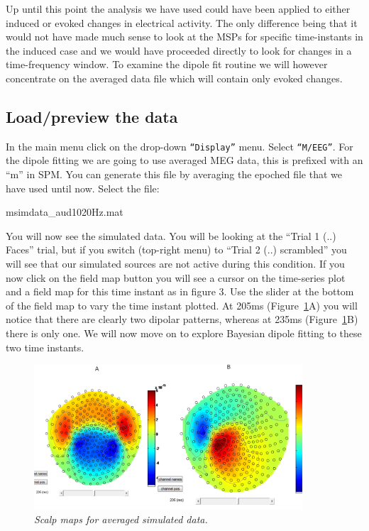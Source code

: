 Up until this point the analysis we have used could have been applied to either induced or evoked changes in electrical activity. The only difference being that it would not have made much sense to look at the MSPs for specific time-instants in the induced case and we would have proceeded directly to look for changes in a time-frequency window. To examine the dipole fit routine we will however concentrate on the averaged data file which will contain only evoked changes.

\subsection{Load/preview the data}

In the main menu click on the drop-down \texttt{``Display''} menu. Select \texttt{``M/EEG''}. For the dipole fitting we are going to use averaged MEG data, this is prefixed with an ``m'' in SPM. You can generate this file by averaging the epoched file that we have used until now. Select the file:

\beginverbatim
msimdata_aud1020Hz.mat
\endverbatim

You will now see the simulated data. You will be looking at the ``Trial 1 (..) Faces'' trial,  but if you switch (top-right menu) to ``Trial 2 (..) scrambled'' you will see that our simulated sources are not active during this condition.  If you now click on the field map button you will see a cursor on the time-series plot and a field map for this time instant as in figure 3. Use the slider at the bottom of the field map to vary the time instant plotted. At 205ms (Figure~\ref{meg_sloc:fig:14}A) you will notice that there are clearly two dipolar patterns, whereas at 235ms (Figure~\ref{meg_sloc:fig:14}B) there is only one.
We will now move on to explore Bayesian dipole fitting to these two time instants.

\begin{figure}
\begin{center}
\includegraphics[width=100mm]{meg_sloc/Slide14}
\caption{\em Scalp maps for averaged simulated data.\label{meg_sloc:fig:14}}
\end{center}
\end{figure}


